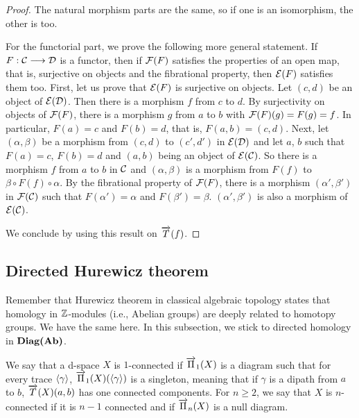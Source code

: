 \begin{proof}
The natural morphism parts are the same, so if one is an isomorphism, the other is too.

For the functorial part, we prove the following more general statement. If $F : \mathcal{C} \longrightarrow \mathcal{D}$ is a functor, then if $\mathcal{F}(F)$ satisfies the properties of an open map, that is, surjective on objects and the fibrational property, then $\mathcal{E}(F)$ satisfies them too. First, let us prove that $\mathcal{E}(F)$ is surjective on objects. Let $(c,d)$ be an object of $\mathcal{E}(\mathcal{D})$. Then there is a morphism $f$ from $c$ to $d$. By surjectivity on objects of $\mathcal{F}(F)$, there is a morphism $g$ from $a$ to $b$ with $\mathcal{F}(F)(g) = F(g) = f$. In particular, $F(a) = c$ and $F(b) = d$, that is, $F(a,b) = (c,d)$. Next, let $(\alpha,\beta)$ be a morphism from $(c,d)$ to $(c',d')$ in $\mathcal{E}(\mathcal{D})$ and let $a$, $b$ such that $F(a) = c$, $F(b) = d$ and $(a,b)$ being an object of $\mathcal{E}(\mathcal{C})$. So there is a morphism $f$ from $a$ to $b$ in $\mathcal{C}$ and $(\alpha,\beta)$ is a morphism from $F(f)$ to $\beta\circ F(f)\circ \alpha$. By the fibrational property of $\mathcal{F}(F)$, there is a morphism $(\alpha',\beta')$ in $\mathcal{F}(\mathcal{C})$ such that $F(\alpha') = \alpha$ and $F(\beta') = \beta$. $(\alpha',\beta')$ is also a morphism of $\mathcal{E}(\mathcal{C})$.

We conclude by using this result on $\overrightarrow{T}(f)$.
\end{proof}


\subsection{Directed Hurewicz theorem}
\label{subsec:dirhur}

Remember that Hurewicz theorem in classical algebraic topology states that homology in $\mathbb{Z}$-modules (i.e., Abelian groups) are deeply related to homotopy groups. We have the same here. In this subsection, we stick to directed homology in $\textbf{Diag(}\textbf{Ab}\textbf{)}$.

We say that a d-space $X$ is $1$-connected if $\overrightarrow{\Pi}_{1}(X)$ is a diagram such that for every trace $\langle\gamma\rangle$, $\overrightarrow{\Pi}_{1}(X)(\langle\gamma\rangle)$ is a singleton, meaning that if $\gamma$ is a dipath from $a$ to $b$, $\overrightarrow{T}(X)(a,b)$ has one connected components. For $n \geq 2$, we say that $X$ is $n$-connected if it is $n-1$ connected and if $\overrightarrow{\Pi}_{n}(X)$ is a null diagram.

